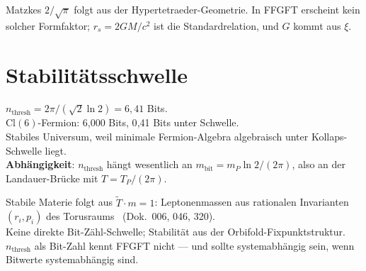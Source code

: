 \begin{tcolorbox}[divbox, title={Divergenz}]
  Matzkes $2/\sqrt{\pi}$ folgt aus der Hypertetraeder-Geometrie.
  In FFGFT erscheint kein solcher Formfaktor; $r_s = 2GM/c^2$ ist die Standardrelation,
  und $G$ kommt aus $\xi$.
\end{tcolorbox}

\section{Stabilitätsschwelle}

\begin{tcolorbox}[matzbox, title={Matzke}]
  $n_{\mathrm{thresh}} = 2\pi/(\sqrt{2}\ln 2) = 6{,}41$ Bits. \B\\
  $\mathrm{Cl}(6)$-Fermion: 6{,}000 Bits, 0{,}41 Bits unter Schwelle.\\
  Stabiles Universum, weil minimale Fermion-Algebra algebraisch unter Kollaps-Schwelle liegt.\\[2pt]
  \textbf{Abhängigkeit}: $n_{\mathrm{thresh}}$ hängt wesentlich an $m_{\mathrm{bit}} = m_P\ln 2/(2\pi)$,
  also an der Landauer-Brücke mit $T = T_P/(2\pi)$.
\end{tcolorbox}

\begin{tcolorbox}[ffgftbox, title={FFGFT}]
  Stabile Materie folgt aus $\tilde{T}\cdot m = 1$:
  Leptonenmassen aus rationalen Invarianten $(r_i, p_i)$ des Torusraums \K\ (Dok.\ 006, 046, 320).\\
  Keine direkte Bit-Zähl-Schwelle; Stabilität aus der Orbifold-Fixpunktstruktur.\\
  $n_{\mathrm{thresh}}$ als Bit-Zahl kennt FFGFT nicht — und sollte systemabhängig sein,
  wenn Bitwerte systemabhängig sind.
\end{tcolorbox}

